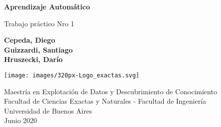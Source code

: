 \begin{titlepage}
   \begin{center}
       \vspace*{1cm}

       \textbf{Aprendizaje Automático}

       \vspace{0.5cm}
        Trabajo práctico Nro 1
            
       \vspace{1.5cm}

       \textbf{
       	  Cepeda, Diego\\
		  Guizzardi, Santiago\\
		  Hruszecki, Darío\\
	    }

       \vfill
            
            
       \vspace{0.8cm}
     
       \texttt{[image: images/320px-Logo\_exactas.svg]}

       \vspace{0.8cm}

        Maestría en Explotación de Datos y Descubrimiento de Conocimiento\\
		Facultad de Ciencias Exactas y Naturales - Facultad de Ingeniería\\
		Universidad de Buenos Aires\\
		Junio 2020            
   \end{center}

\end{titlepage}